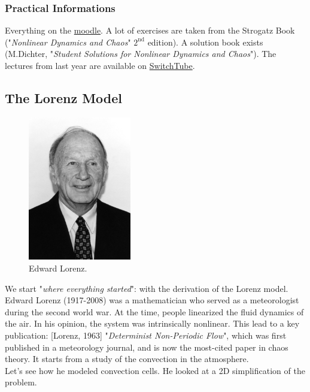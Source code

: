 \subsubsection{Practical Informations}

Everything on the \href{https://moodle.epfl.ch/course/view.php?id=15697}{moodle}. A lot of exercises are taken from the Strogatz Book ("\textit{Nonlinear Dynamics and Chaos}" $2^\text{nd}$ edition). A solution book exists (M.Dichter, "\textit{Student Solutions for Nonlinear Dynamics and Chaos}"). The lectures from last year are available on \href{https://moodle.epfl.ch/course/view.php?id=15697#section-3}{SwitchTube}.

\subsection{The Lorenz Model}

\begin{figure}[h!]
    \centering
    \includegraphics[width=0.4\textwidth]{figures/1_Edward_lorenz.jpg}
    \caption{Edward Lorenz.}
\end{figure}

We start "\textit{where everything started}": with the derivation of the Lorenz model. Edward Lorenz (1917-2008) was a mathematician who served as a meteorologist during the second world war. At the time, people linearized the fluid dynamics of the air. In his opinion, the system was intrinsically nonlinear. This lead to a key publication: [Lorenz, 1963] "\textit{Determinist Non-Periodic Flow}", which was first published in a meteorology journal, and is now the most-cited paper in chaos theory. It starts from a study of the convection in the atmosphere. \\

Let's see how he modeled convection cells. He looked at a 2D simplification of the problem.\\

